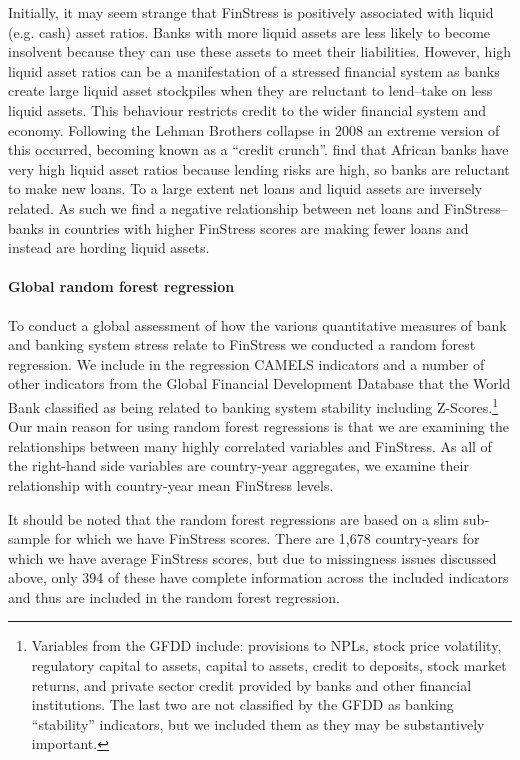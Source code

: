 \documentclass[]{article}
\begin{document}
Initially, it may seem strange that FinStress is positively associated with liquid (e.g. cash) asset ratios. Banks with more liquid assets are less likely to become insolvent because they can use these assets to meet their liabilities. However, high liquid asset ratios can be a manifestation of a stressed financial system as banks create large liquid asset stockpiles when they are reluctant to lend--take on less liquid assets. This behaviour restricts credit to the wider financial system and economy. Following the Lehman Brothers collapse in 2008 an extreme version of this occurred, becoming known as a ``credit crunch''. \cite{Andrianova2014} find that African banks have very high liquid asset ratios because lending risks are high, so banks are reluctant to make new loans. To a large extent net loans and liquid assets are inversely related. As such we find a negative relationship between net loans and FinStress--banks in countries with higher FinStress scores are making fewer loans and instead are hording liquid assets.

\paragraph{Global random forest regression}

To conduct a global assessment of how the various quantitative measures of bank and banking system stress relate to FinStress we conducted a random forest regression. We include in the regression CAMELS indicators and a number of other indicators from the Global Financial Development Database that the World Bank classified as being related to banking system stability \citep{worldbank2015} including Z-Scores.\footnote{Variables from the GFDD include: provisions to NPLs, stock price volatility, regulatory capital to assets, capital to assets, credit to deposits, stock market returns, and private sector credit provided by banks and other financial institutions. The last two are not classified by the GFDD as banking ``stability'' indicators, but we included them as they may be substantively important.} Our main reason for using random forest regressions is that we are examining the relationships between many highly correlated variables and FinStress. As all of the right-hand side variables are country-year aggregates, we examine their relationship with country-year mean FinStress levels.

It should be noted that the random forest regressions are based on a slim sub-sample for which we have FinStress scores. There are 1,678 country-years for which we have average FinStress scores, but due to missingness issues discussed above, only 394 of these have complete information across the included indicators and thus are included in the random forest regression.
\end{document}
